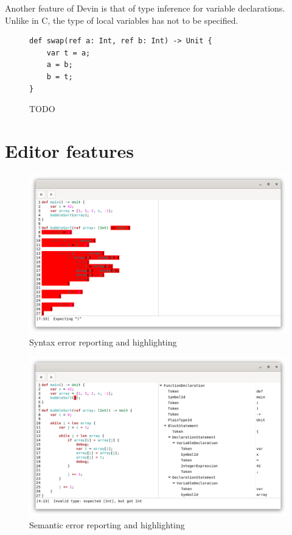 \documentclass[11pt, american, draft]{PhdThesis}
\begin{document}
  Another feature of Devin is that of type inference for variable declarations. Unlike in C, the
  type of local variables has not to be specified.

  \begin{figure}[H]
    \center

    \begin{verbatim}
def swap(ref a: Int, ref b: Int) -> Unit {
    var t = a;
    a = b;
    b = t;
}
    \end{verbatim}

    \caption{TODO}
  \end{figure}

  \section{Editor features}

  \begin{figure}[H]
    \center
    \includegraphics[width=0.9\linewidth]{3.png}
    \caption{Syntax error reporting and highlighting}
  \end{figure}

  \begin{figure}[H]
    \center
    \includegraphics[width=0.9\linewidth]{4.png}
    \caption{Semantic error reporting and highlighting}
  \end{figure}
\end{document}
